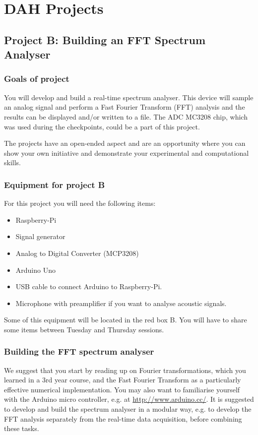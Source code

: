 \chapter{DAH Projects}
\label{sec:projects}


\section{Project B: Building an FFT Spectrum Analyser}

\subsection{Goals of project}

You will develop and build a real-time spectrum analyser. This device will sample an analog signal and perform a Fast Fourier Transform (FFT) analysis and the results can be displayed and/or written to a file. The ADC MC3208 chip, which was used during the checkpoints,  could be a part of this project. 

The projects have an open-ended aspect and are an opportunity where you can show your own initiative and demonstrate your experimental and computational skills. 


\subsection{Equipment for project B}

For this project you will need the following items:
\begin{itemize}
\item Raspberry-Pi
\item Signal generator
\item Analog to Digital Converter (MCP3208)
\item Arduino Uno 
\item USB cable to connect Arduino to Raspberry-Pi.
\item Microphone with preamplifier if you want to analyse acoustic signals. 
\end{itemize}
Some of this equipment will be located in the red box B. You will have to share some items between Tuesday and Thursday sessions. 


\subsection{Building the FFT spectrum analyser}

We suggest that you start by reading up on Fourier transformations, which you learned in a 3rd year course, and the Fast Fourier Transform as a particularly effective numerical implementation. You may also want to familiarise yourself with the Arduino micro controller, e.g. at \url{http://www.arduino.cc/}. It is suggested to develop and build the spectrum analyser in a modular way, e.g. to develop the FFT analysis separately from the real-time data acquisition, before combining these tasks.

